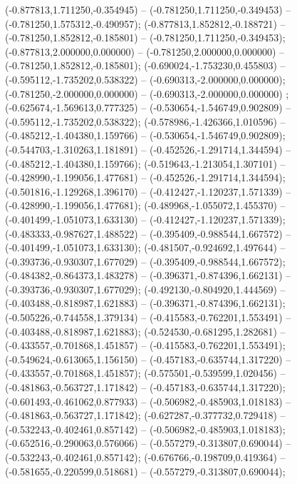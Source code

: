  (-0.877813,1.711250,-0.354945) -- (-0.781250,1.711250,-0.349453) -- (-0.781250,1.575312,-0.490957);
 (-0.877813,1.852812,-0.188721) -- (-0.781250,1.852812,-0.185801) -- (-0.781250,1.711250,-0.349453);
 (-0.877813,2.000000,0.000000) -- (-0.781250,2.000000,0.000000) -- (-0.781250,1.852812,-0.185801);
 (-0.690024,-1.753230,0.455803) -- (-0.595112,-1.735202,0.538322) -- (-0.690313,-2.000000,0.000000);
 (-0.781250,-2.000000,0.000000) -- (-0.690313,-2.000000,0.000000) ;
 (-0.625674,-1.569613,0.777325) -- (-0.530654,-1.546749,0.902809) -- (-0.595112,-1.735202,0.538322);
 (-0.578986,-1.426366,1.010596) -- (-0.485212,-1.404380,1.159766) -- (-0.530654,-1.546749,0.902809);
 (-0.544703,-1.310263,1.181891) -- (-0.452526,-1.291714,1.344594) -- (-0.485212,-1.404380,1.159766);
 (-0.519643,-1.213054,1.307101) -- (-0.428990,-1.199056,1.477681) -- (-0.452526,-1.291714,1.344594);
 (-0.501816,-1.129268,1.396170) -- (-0.412427,-1.120237,1.571339) -- (-0.428990,-1.199056,1.477681);
 (-0.489968,-1.055072,1.455370) -- (-0.401499,-1.051073,1.633130) -- (-0.412427,-1.120237,1.571339);
 (-0.483333,-0.987627,1.488522) -- (-0.395409,-0.988544,1.667572) -- (-0.401499,-1.051073,1.633130);
 (-0.481507,-0.924692,1.497644) -- (-0.393736,-0.930307,1.677029) -- (-0.395409,-0.988544,1.667572);
 (-0.484382,-0.864373,1.483278) -- (-0.396371,-0.874396,1.662131) -- (-0.393736,-0.930307,1.677029);
 (-0.492130,-0.804920,1.444569) -- (-0.403488,-0.818987,1.621883) -- (-0.396371,-0.874396,1.662131);
 (-0.505226,-0.744558,1.379134) -- (-0.415583,-0.762201,1.553491) -- (-0.403488,-0.818987,1.621883);
 (-0.524530,-0.681295,1.282681) -- (-0.433557,-0.701868,1.451857) -- (-0.415583,-0.762201,1.553491);
 (-0.549624,-0.613065,1.156150) -- (-0.457183,-0.635744,1.317220) -- (-0.433557,-0.701868,1.451857);
 (-0.575501,-0.539599,1.020456) -- (-0.481863,-0.563727,1.171842) -- (-0.457183,-0.635744,1.317220);
 (-0.601493,-0.461062,0.877933) -- (-0.506982,-0.485903,1.018183) -- (-0.481863,-0.563727,1.171842);
 (-0.627287,-0.377732,0.729418) -- (-0.532243,-0.402461,0.857142) -- (-0.506982,-0.485903,1.018183);
 (-0.652516,-0.290063,0.576066) -- (-0.557279,-0.313807,0.690044) -- (-0.532243,-0.402461,0.857142);
 (-0.676766,-0.198709,0.419364) -- (-0.581655,-0.220599,0.518681) -- (-0.557279,-0.313807,0.690044);
